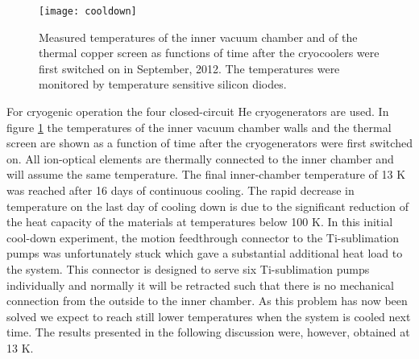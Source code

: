 \documentclass[aps,pra,preprint,superscriptaddress]{revtex4}
\begin{document}
\begin{figure}
	\centering
		\texttt{[image: cooldown]}
	\caption{Measured temperatures of the inner vacuum chamber and of the thermal copper screen as functions of time after the cryocoolers were first switched on in September, 2012. The temperatures were monitored by temperature sensitive silicon diodes.}
	\label{fig:cooldown}
\end{figure}
For cryogenic operation the four closed-circuit He cryogenerators are used. In figure \ref{fig:cooldown} the temperatures of the inner vacuum chamber walls and the thermal screen are shown as a function of time after the cryogenerators were first switched on. All ion-optical elements are thermally connected to the inner chamber and will assume the same temperature. The final inner-chamber temperature of 13 K was reached after 16 days of continuous cooling. The rapid decrease in temperature on the last day of cooling down is due to the significant reduction of the heat capacity of the materials at temperatures below 100 K. In this initial cool-down experiment, the motion feedthrough connector to the Ti-sublimation pumps was unfortunately stuck which gave a substantial additional heat load to the system. This connector is designed to serve six Ti-sublimation pumps individually and normally it will be retracted such that there is no mechanical connection from the outside to the inner chamber. As this problem has now been solved we expect to reach still lower temperatures when the system is cooled next time. The results presented in the following discussion were, however, obtained at 13 K.
\end{document}
